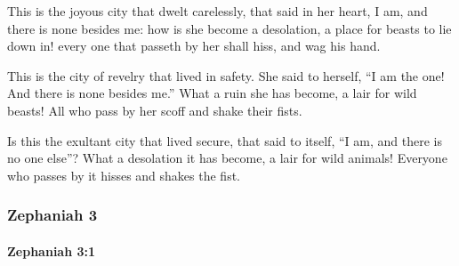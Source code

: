 			\begin{versebox}
					\item[BHS] 
					\item[LXX] 
					\item[ASV] This is the joyous city that dwelt carelessly, that said in her heart, I am, and there is none besides me: how is she become a desolation, a place for beasts to lie down in! every one that passeth by her shall hiss, and wag his hand.
					\item[NIV] This is the city of revelry that lived in safety. She said to herself, “I am the one! And there is none besides me.” What a ruin she has become, a lair for wild beasts! All who pass by her scoff and shake their fists.
					\item[NRSV] Is this the exultant city that lived secure, that said to itself, “I am, and there is no one else”? What a desolation it has become, a lair for wild animals! Everyone who passes by it hisses and shakes the fist.
			\end{versebox}
	\subsubsection{Zephaniah 3} %
		\label{ZEPHANIAH-3}

		\paragraph{Zephaniah 3:1} %
			\label{ZEPHANIAH-3-1}

